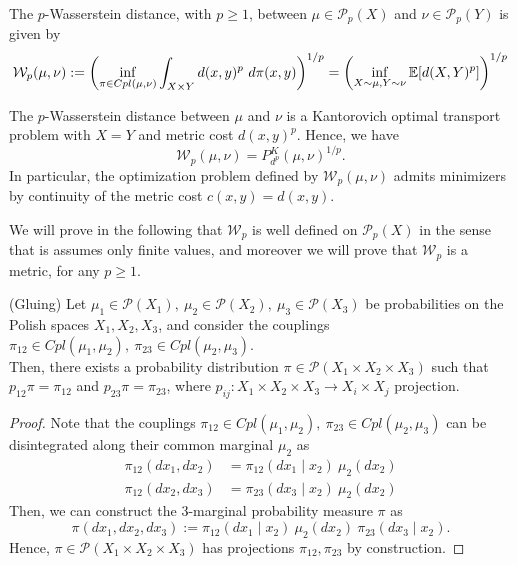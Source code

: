\documentclass[../main.tex]{subfiles}
\begin{document}
\begin{definition}
    The $p$-Wasserstein distance, with $p\geq 1$, between $\mu\in\mathcal{P}_p(X)$ and $\nu\in\mathcal{P}_p(Y)$ is given by
    $$
    \mathcal{W}_p(\mu, \nu) 
    := \left(\inf_{\pi\in Cpl(\mu, \nu)} \int_{X\times Y} d(x, y)^p \ d\pi(x, y) \right)^{1/p}
    = \left(\inf_{X\sim\mu, Y\sim\nu} \E[d(X, Y)^p]\right)^{1/p}
    $$
\end{definition}

\begin{remark}
    The $p$-Wasserstein distance between $\mu$ and $\nu$ is a Kantorovich optimal transport problem with $X=Y$ and metric cost $d(x, y)^p$. Hence, we have $$\mathcal{W}_p(\mu, \nu) = P^K_{d^p}(\mu, \nu)^{1/p}. $$
    In particular, the optimization problem defined by $\mathcal{W}_p(\mu, \nu)$ admits minimizers by continuity of the metric cost $c(x, y) = d(x, y)$.
\end{remark}

\noindent
We will prove in the following that $\mathcal{W}_p$ is well defined on $\mathcal{P}_p(X)$ in the sense that is assumes only finite values, and moreover we will prove that $\mathcal{W}_p$ is a metric, for any $p\geq 1$.

\begin{lemma}
    (Gluing)
    \label{lemma:gluing_lemma} Let $\mu_1\in \mathcal{P}(X_1), \ \mu_2\in \mathcal{P}(X_2), \ \mu_3\in \mathcal{P}(X_3)$ be probabilities on the Polish spaces $X_1, X_2, X_3$, and consider the couplings $\pi_{12}\in Cpl(\mu_1, \mu_2), \ \pi_{23}\in Cpl(\mu_2, \mu_3)$. \\
    Then, there exists a probability distribution $\pi\in\mathcal{P}(X_1 \times X_2 \times X_3)$ such that $p_{12}\pi = \pi_{12}$ and $p_{23}\pi = \pi_{23}$, where $p_{ij}: X_1\times X_2 \times X_3 \to X_i\times X_j$ projection.
\end{lemma}
\begin{proof}
    Note that the couplings $\pi_{12}\in Cpl(\mu_1, \mu_2), \ \pi_{23}\in Cpl(\mu_2, \mu_3)$ can be disintegrated along their common marginal $\mu_2$ as
    \begin{align*}
        \pi_{12}(dx_1, dx_2) &= \pi_{12}(dx_1 \mid x_2) \ \mu_2(dx_2) \\
        \pi_{12}(dx_2, dx_3) &= \pi_{23}(dx_3 \mid x_2) \ \mu_2(dx_2)
    \end{align*}
    Then, we can construct the $3$-marginal probability measure $\pi$ as 
    $$
    \pi(dx_1, dx_2, dx_3) := \pi_{12}(dx_1 \mid x_2) \ \mu_2(dx_2) \ \pi_{23}(dx_3 \mid x_2).
    $$
    Hence, $\pi\in \mathcal{P}(X_1 \times X_2 \times X_3)$ has projections $\pi_{12}, \pi_{23}$ by construction.
\end{proof}
\end{document}
